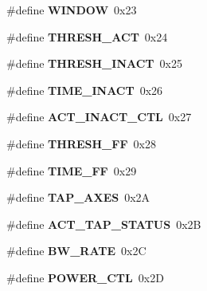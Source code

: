\begin{DoxyCompactItemize}
\item 
\hypertarget{group___a_d_x_l345_ga58dde5b4c75245b4660a165318cac36b}{
\#define {\bfseries WINDOW}~0x23}
\label{group___a_d_x_l345_ga58dde5b4c75245b4660a165318cac36b}

\item 
\hypertarget{group___a_d_x_l345_gaede29895883c40f0be2f4e509019bb35}{
\#define {\bfseries THRESH\_\-ACT}~0x24}
\label{group___a_d_x_l345_gaede29895883c40f0be2f4e509019bb35}

\item 
\hypertarget{group___a_d_x_l345_ga53c6ad41a83f84d0d272f78350b8e144}{
\#define {\bfseries THRESH\_\-INACT}~0x25}
\label{group___a_d_x_l345_ga53c6ad41a83f84d0d272f78350b8e144}

\item 
\hypertarget{group___a_d_x_l345_gabc84e6e6917a9bfe611da2914a580842}{
\#define {\bfseries TIME\_\-INACT}~0x26}
\label{group___a_d_x_l345_gabc84e6e6917a9bfe611da2914a580842}

\item 
\hypertarget{group___a_d_x_l345_gacbc34474d6dd061daa0fa70d946c18ff}{
\#define {\bfseries ACT\_\-INACT\_\-CTL}~0x27}
\label{group___a_d_x_l345_gacbc34474d6dd061daa0fa70d946c18ff}

\item 
\hypertarget{group___a_d_x_l345_gaf4316f275ad7d11d0ea3778b88be8dea}{
\#define {\bfseries THRESH\_\-FF}~0x28}
\label{group___a_d_x_l345_gaf4316f275ad7d11d0ea3778b88be8dea}

\item 
\hypertarget{group___a_d_x_l345_gaa0fea52b674b391e9c7abf2149ace316}{
\#define {\bfseries TIME\_\-FF}~0x29}
\label{group___a_d_x_l345_gaa0fea52b674b391e9c7abf2149ace316}

\item 
\hypertarget{group___a_d_x_l345_gaab9e7647afc6e0f7e537b7cb2bdab57b}{
\#define {\bfseries TAP\_\-AXES}~0x2A}
\label{group___a_d_x_l345_gaab9e7647afc6e0f7e537b7cb2bdab57b}

\item 
\hypertarget{group___a_d_x_l345_ga0f6c8c7ea3016f3792f26fd77b4bb839}{
\#define {\bfseries ACT\_\-TAP\_\-STATUS}~0x2B}
\label{group___a_d_x_l345_ga0f6c8c7ea3016f3792f26fd77b4bb839}

\item 
\hypertarget{group___a_d_x_l345_gac58f87a59871d65bd54ed20ff8a57255}{
\#define {\bfseries BW\_\-RATE}~0x2C}
\label{group___a_d_x_l345_gac58f87a59871d65bd54ed20ff8a57255}

\item 
\hypertarget{group___a_d_x_l345_ga3d1c4b49cdb2a4fc68c03863dcb5dbb4}{
\#define {\bfseries POWER\_\-CTL}~0x2D}
\label{group___a_d_x_l345_ga3d1c4b49cdb2a4fc68c03863dcb5dbb4}


\end{DoxyCompactItemize}
